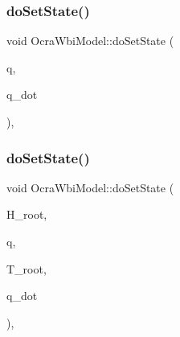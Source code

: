 \hypertarget{classocra__icub_1_1OcraWbiModel_a8639b19a514624953e5e58dbde1c8227}{}\label{classocra__icub_1_1OcraWbiModel_a8639b19a514624953e5e58dbde1c8227} 
\subsubsection{\texorpdfstring{do\+Set\+State()}{doSetState()}\hspace{0.1cm}{\footnotesize\ttfamily [1/2]}}
{\footnotesize\ttfamily void Ocra\+Wbi\+Model\+::do\+Set\+State (\begin{DoxyParamCaption}\item[{const Eigen\+::\+Vector\+Xd \&}]{q,  }\item[{const Eigen\+::\+Vector\+Xd \&}]{q\+\_\+dot }\end{DoxyParamCaption})\hspace{0.3cm}{\ttfamily [protected]}, {\ttfamily [virtual]}}

\hypertarget{classocra__icub_1_1OcraWbiModel_a411c844cbde565ed54a224e39a2e65c1}{}\label{classocra__icub_1_1OcraWbiModel_a411c844cbde565ed54a224e39a2e65c1} 
\subsubsection{\texorpdfstring{do\+Set\+State()}{doSetState()}\hspace{0.1cm}{\footnotesize\ttfamily [2/2]}}
{\footnotesize\ttfamily void Ocra\+Wbi\+Model\+::do\+Set\+State (\begin{DoxyParamCaption}\item[{const Eigen\+::\+Displacementd \&}]{H\+\_\+root,  }\item[{const Eigen\+::\+Vector\+Xd \&}]{q,  }\item[{const Eigen\+::\+Twistd \&}]{T\+\_\+root,  }\item[{const Eigen\+::\+Vector\+Xd \&}]{q\+\_\+dot }\end{DoxyParamCaption})\hspace{0.3cm}{\ttfamily [protected]}, {\ttfamily [virtual]}}

